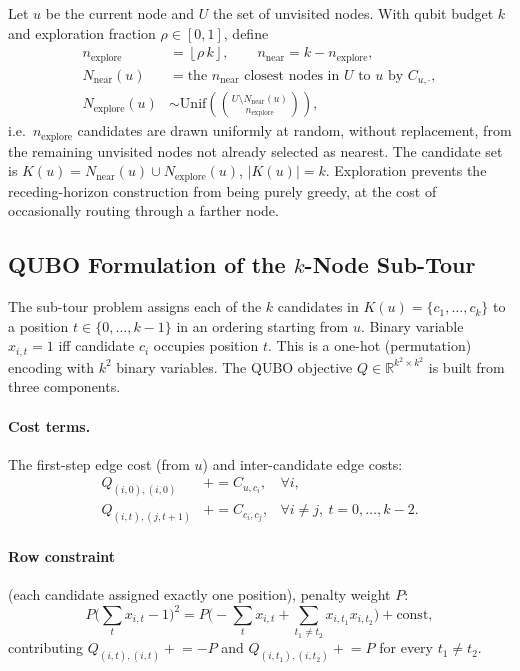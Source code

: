 \documentclass[11pt]{article}
\newcommand{\Real}{\mathbb{R}}
\begin{document}
Let $u$ be the current node and $U$ the set of unvisited nodes. With qubit budget $k$ and exploration fraction $\rho \in [0,1]$, define
\begin{align}
  n_{\mathrm{explore}} &= \left\lfloor \rho \, k \right\rfloor, \qquad n_{\mathrm{near}} = k - n_{\mathrm{explore}}, \\
  N_{\mathrm{near}}(u) &= \text{the } n_{\mathrm{near}} \text{ closest nodes in } U \text{ to } u \text{ by } C_{u,\cdot}, \\
  N_{\mathrm{explore}}(u) &\sim \mathrm{Unif}\!\left(\binom{U \setminus N_{\mathrm{near}}(u)}{n_{\mathrm{explore}}}\right),
\end{align}
i.e.\ $n_{\mathrm{explore}}$ candidates are drawn uniformly at random, without replacement, from the remaining unvisited nodes not already selected as nearest. The candidate set is $K(u) = N_{\mathrm{near}}(u) \cup N_{\mathrm{explore}}(u)$, $|K(u)| = k$. Exploration prevents the receding-horizon construction from being purely greedy, at the cost of occasionally routing through a farther node.

\subsection{QUBO Formulation of the $k$-Node Sub-Tour}
\label{sec:hybrid-qubo}

The sub-tour problem assigns each of the $k$ candidates in $K(u) = \{c_1,\dots,c_k\}$ to a position $t \in \{0,\dots,k-1\}$ in an ordering starting from $u$. Binary variable $x_{i,t} = 1$ iff candidate $c_i$ occupies position $t$. This is a one-hot (permutation) encoding with $k^2$ binary variables. The QUBO objective $Q \in \Real^{k^2 \times k^2}$ is built from three components.

\paragraph{Cost terms.} The first-step edge cost (from $u$) and inter-candidate edge costs:
\begin{align}
  Q_{(i,0),(i,0)} &\mathrel{+}= C_{u, c_i}, & \forall i, \\
  Q_{(i,t),(j,t+1)} &\mathrel{+}= C_{c_i, c_j}, & \forall i \ne j,\ t = 0,\dots,k-2.
\end{align}

\paragraph{Row constraint} (each candidate assigned exactly one position), penalty weight $P$:
\begin{equation}
  P\Big(\sum_{t} x_{i,t} - 1\Big)^2 = P\Big({-}\sum_t x_{i,t} + \sum_{t_1 \ne t_2} x_{i,t_1}x_{i,t_2}\Big) + \text{const},
\end{equation}
contributing $Q_{(i,t),(i,t)} \mathrel{+}= -P$ and $Q_{(i,t_1),(i,t_2)} \mathrel{+}= P$ for every $t_1 \ne t_2$.
\end{document}
